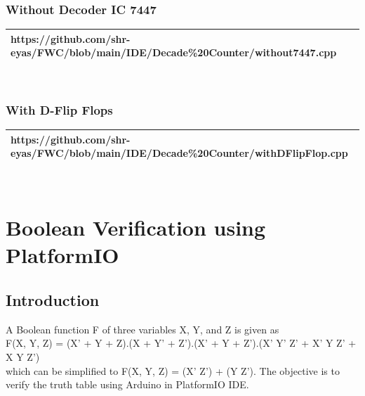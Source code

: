 \documentclass[journal,10pt]{article}
\begin{document}
\subsubsection{Without Decoder IC 7447}
    \begin{tabularx}{0.8\textwidth} { 
    | >{\centering\arraybackslash}X |}
    \hline
    https://github.com/shr-eyas/FWC/blob/main/IDE/Decade\%20Counter/without7447.cpp\\
    \hline
    \end{tabularx}
\\
\subsubsection{With D-Flip Flops}
    \begin{tabularx}{0.8\textwidth} { 
    | >{\centering\arraybackslash}X |}
    \hline
    https://github.com/shr-eyas/FWC/blob/main/IDE/Decade\%20Counter/withDFlipFlop.cpp\\
    \hline
    \end{tabularx}
\\

\clearpage
\section{Boolean Verification using PlatformIO}

\subsection{Introduction}
\begin{flushleft}
A Boolean function F of three variables X, Y, and Z is given as \\F(X, Y, Z) = (X' + Y + Z).(X + Y' + Z').(X' + Y + Z').(X' Y' Z' + X' Y Z' + X Y Z') \\which can be simplified to F(X, Y, Z) = (X' Z') + (Y Z'). The objective is to verify the truth table using Arduino in PlatformIO IDE.
\end{flushleft}
\end{document}
